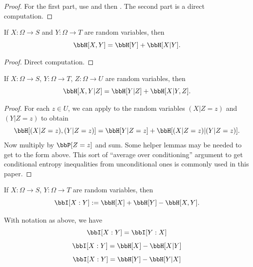 \begin{proof}
  \leanok
  For the first part, use  and then .  The second part is a direct computation.
\end{proof}


\begin{lemma}\label{chain-rule}
  \leanok
  If $X: \Omega \to S$ and $Y: \Omega \to T$ are random variables, then
  $$ \bbH[X, Y] = \bbH[Y] + \bbH[X|Y].$$
  \end{lemma}
  \begin{proof}
  \leanok
  Direct computation.
\end{proof}

\begin{lemma}\label{conditional-chain-rule}
  \leanok
  If $X: \Omega \to S$, $Y: \Omega \to T$, $Z: \Omega \to U$ are random variables, then
$$ \bbH[X, Y | Z] = \bbH[Y | Z] + \bbH[X|Y, Z].$$
\end{lemma}

\begin{proof}  \leanok
   For each $z \in U$, we can apply  to the random variables $(X|Z=z)$ and $(Y|Z=z)$ to obtain
  $$ \bbH[(X|Z=z),(Y|Z=z)] = \bbH[Y|Z=z] + \bbH[(X|Z=z)|(Y|Z=z)].$$
  Now multiply by $\bbP[Z=z]$ and sum.  Some helper lemmas may be needed to get to the form above.  This sort of ``average over conditioning'' argument to get conditional entropy inequalities from unconditional ones is commonly used in this paper.
\end{proof}

\begin{definition}
  \label{information-def}
  \leanok
  If $X: \Omega \to S$, $Y: \Omega \to T$ are random variables, then
  $$\bbI[X : Y] := \bbH[X] + \bbH[Y] - \bbH[X,Y].$$
\end{definition}

\begin{lemma}
  \label{alternative-mutual}
  \leanok
  With notation as above, we have
  $$  \bbI[X : Y] = \bbI[Y:X]$$
  $$  \bbI[X : Y] = \bbH[X] - \bbH[X|Y]$$
  $$  \bbI[X : Y] = \bbH[Y] - \bbH[Y|X]$$
\end{lemma}

